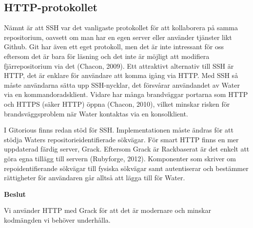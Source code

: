 \subsection{HTTP-protokollet}
Nämnt är att SSH var det vanligaste protokollet för att kollaborera på samma
repositorium, oavsett om man har en egen server eller använder tjänster likt
Github. Git har även ett eget protokoll, men det är inte intressant för oss
eftersom det är bara för läsning och det inte är möjligt att modifiera
fjärrepositorium via det (Chacon, 2009). Ett attraktivt alternativ till SSH är
HTTP, det är enklare för användare att komma igång via HTTP.  Med SSH så måste
användarna sätta upp SSH-nycklar, det försvårar användandet av Water via en
kommandoradsklient.  Vidare har många brandväggar portarna som HTTP och HTTPS
(säker HTTP) öppna (Chacon, 2010), vilket minskar risken för brandsväggsproblem
när Water kontaktas via en konsolklient.

I Gitorious finns redan stöd för SSH. Implementationen måste ändras för att
stödja Waters repositorieidentifierade sökvägar. För smart HTTP finns en mer
uppdaterad färdig server, Grack.  Eftersom Grack är Rackbaserat är det enkelt
att göra egna tillägg till servern (Rubyforge, 2012). Komponenter som skriver
om repoidentifierande sökvägar till fysiska sökvägar samt autentiserar och
bestämmer rättigheter för användaren går alltså att lägga till för Water.

\begin{flushright}
  
  \textbf{Beslut}
  
  Vi använder HTTP med Grack för att det är modernare och minskar kodmängden vi behöver underhålla.
  
\end{flushright}
